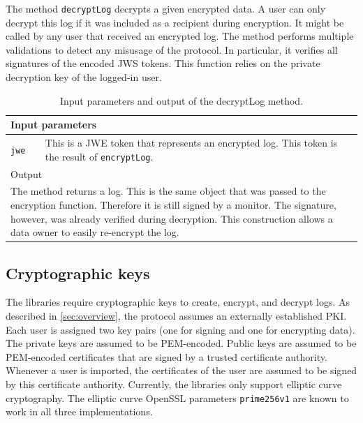 \documentclass[../main.tex]{subfiles}
\begin{document}
The method \verb|decryptLog| decrypts a given encrypted data.
A user can only decrypt this log if it was included as a recipient during encryption.
It might be called by any user that received an encrypted log.
The method performs multiple validations to detect any misusage of the protocol.
In particular, it verifies all signatures of the encoded JWS tokens.
This function relies on the private decryption key of the logged-in user.
\begin{table}[ht]
    \centering
    \begin{tabular}{|p{3cm}p{10cm}|}
        \hline
        \multicolumn{2}{|l|}{Input parameters}    \\ \hline
        \verb|jwe|              & This is a JWE token that represents an encrypted log. This token is the result of \verb|encryptLog|. \\ \hline
            \multicolumn{2}{|l|}{Output}   \\ \hline
        \multicolumn{2}{|p{13cm}|}{The method returns a log. This is the same object that was passed to the encryption function. Therefore it is still signed by a monitor. The signature, however, was already verified during decryption. This construction allows a data owner to easily re-encrypt the log.} \\ \hline
    \end{tabular}
    \caption[Signature of decryptLog]{Input parameters and output of the decryptLog method.}
\end{table}

\subsection{Cryptographic keys}
The libraries require cryptographic keys to create, encrypt, and decrypt logs.
As described in \cref{sec:overview}, the protocol assumes an externally established PKI.
Each user is assigned two key pairs (one for signing and one for encrypting data).
The private keys are assumed to be PEM-encoded.
Public keys are assumed to be PEM-encoded certificates that are signed by a trusted certificate authority.
Whenever a user is imported, the certificates of the user are assumed to be signed by this certificate authority.
Currently, the libraries only support elliptic curve cryptography.
The elliptic curve OpenSSL parameters \verb|prime256v1| are known to work in all three implementations.
\end{document}
